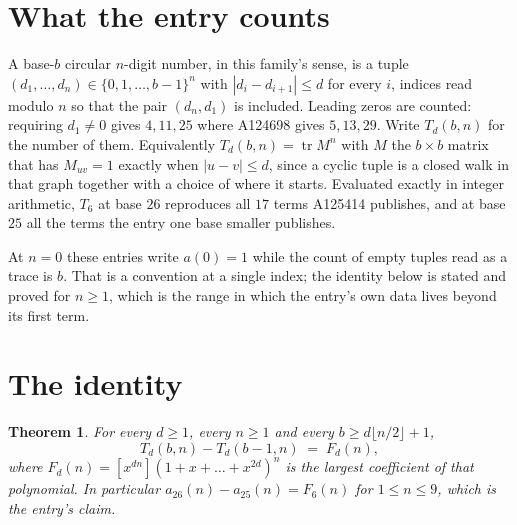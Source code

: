 \documentclass[11pt,a4paper]{article}
\theoremstyle{plain}
\newtheorem{theorem}{Theorem}
\theoremstyle{definition}
\begin{document}
\section{What the entry counts}

A base-$b$ circular $n$-digit number, in this family's sense, is a tuple
$(d_1,\dots,d_n)\in\{0,1,\dots,b-1\}^{n}$ with $|d_i-d_{i+1}|\le d$ for every $i$, indices
read modulo $n$ so that the pair $(d_n,d_1)$ is included. Leading zeros are counted: requiring
$d_1\ne0$ gives $4,11,25$ where A124698 gives $5,13,29$. Write $T_d(b,n)$ for the number of
them. Equivalently $T_d(b,n)=\operatorname{tr}M^{n}$ with $M$ the $b\times b$ matrix that has
$M_{uv}=1$ exactly when $|u-v|\le d$, since a cyclic tuple is a closed walk in that graph
together with a choice of where it starts. Evaluated exactly in integer arithmetic, $T_{6}$
at base $26$ reproduces all $17$ terms A125414 publishes, and at base $25$ all the
terms the entry one base smaller publishes.

At $n=0$ these entries write $a(0)=1$ while the count of empty tuples read as a trace is $b$.
That is a convention at a single index; the identity below is stated and proved for $n\ge1$,
which is the range in which the entry's own data lives beyond its first term.

\section{The identity}

\begin{theorem}
For every $d\ge1$, every $n\ge1$ and every $b\ge d\lfloor n/2\rfloor+1$,
\[
T_d(b,n)-T_d(b-1,n)\;=\;F_d(n),
\]
where $F_d(n)=[x^{dn}](1+x+\dots+x^{2d})^{n}$ is the largest coefficient of that
polynomial. In particular $a_{26}(n)-a_{25}(n)=F_{6}(n)$ for $1\le n\le9$, which
is the entry's claim.
\end{theorem}
\end{document}
